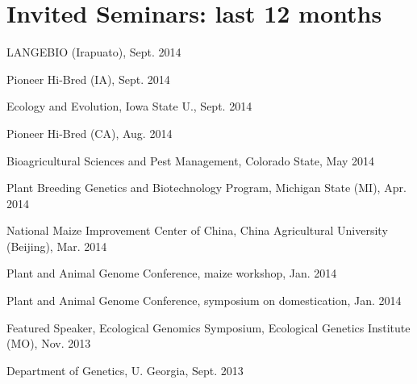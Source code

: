 \documentclass[letterpaper]{article}
\renewenvironment{itemize}{
  \begin{list}{}{
    \setlength{\leftmargin}{1.5em}
  }
}{
  \end{list}
}
\begin{document}
\section*{Invited Seminars: last 12 months}
\begin{itemize}

\item LANGEBIO (Irapuato), Sept. 2014
\item Pioneer Hi-Bred (IA), Sept. 2014
\item Ecology and Evolution, Iowa State U., Sept. 2014
\item Pioneer Hi-Bred (CA), Aug. 2014
\item Bioagricultural Sciences and Pest Management, Colorado State, May 2014
\item Plant Breeding Genetics and Biotechnology Program, Michigan State (MI), Apr. 2014
\item National Maize Improvement Center of China, China Agricultural University (Beijing), Mar. 2014
\item Plant and Animal Genome Conference, maize workshop, Jan. 2014
\item Plant and Animal Genome Conference, symposium on domestication, Jan. 2014
\item Featured Speaker, Ecological Genomics Symposium, Ecological Genetics Institute (MO), Nov. 2013
\item Department of Genetics, U. Georgia, Sept. 2013

\end{itemize}
\end{document}
